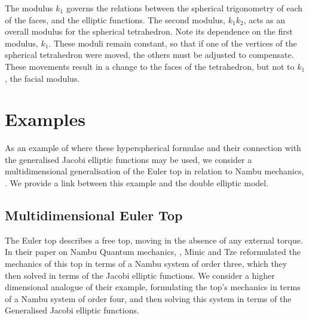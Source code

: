 \documentclass[fleqn,11pt,twoside]{article}
\theoremstyle{definition}
\begin{document}
The modulus $k_1$ governs the relations between the spherical trigonometry of each of the faces, and the elliptic functions. 
The second modulus, $k_1k_2$, acts as an overall modulus for the spherical tetrahedron. Note its dependence on the first 
modulus, $k_1$. These moduli remain constant, so that if one of the vertices of the spherical tetrahedron were moved, the 
others must be adjusted to compensate. These movements result in a change to the faces of the tetrahedron, but not to $k_1$, 
the facial modulus. 

\section{Examples}

As an example of where these hyperspherical formulae and their connection with the generalised Jacobi elliptic functions may be used,  we consider a multidimensional generalisation of the Euler top in relation to Nambu mechanics, \cite{Nambu}. We provide a link between this example and the double elliptic model.
\subsection{Multidimensional Euler Top}

The Euler top describes a free top, moving in the absence of any external torque. In their paper on Nambu Quantum mechanics, \cite{Minic}, Minic and Tze reformulated the mechanics of this top in terms of a Nambu system of order three, which they then solved in terms of the Jacobi elliptic functions. We consider a higher dimensional analogue of their example, formulating the top's mechanics in terms of a Nambu system of order four, and then solving this system in terms of the Generalised Jacobi elliptic functions.
\end{document}

